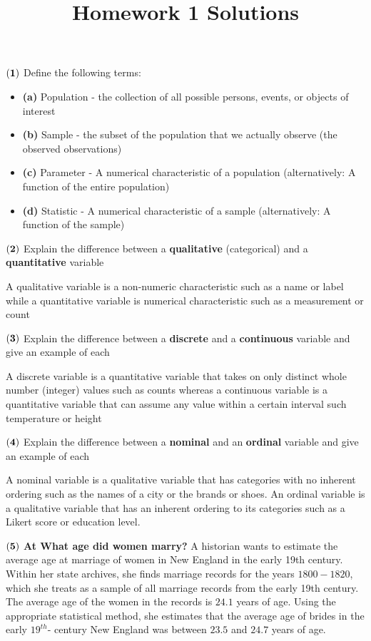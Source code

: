 \documentclass[
]{article}
\title{Homework 1 Solutions}
\author{}
\date{\vspace{-2.5em}}
\providecommand{\tightlist}{%
  \setlength{\itemsep}{0pt}\setlength{\parskip}{0pt}}
\begin{document}
\maketitle

\({\bf (1)}\) Define the following terms:

\begin{itemize}
\tightlist
\item
  \textbf{(a)} Population - the collection of all possible persons,
  events, or objects of interest
\item
  \textbf{(b)} Sample - the subset of the population that we actually
  observe (the observed observations)
\item
  \textbf{(c)} Parameter - A numerical characteristic of a population
  (alternatively: A function of the entire population)
\item
  \textbf{(d)} Statistic - A numerical characteristic of a sample
  (alternatively: A function of the sample)
\end{itemize}

\({\bf (2)}\) Explain the difference between a \textbf{qualitative}
(categorical) and a \textbf{quantitative} variable

{A qualitative variable is a non-numeric characteristic such as a name
or label while a quantitative variable is numerical characteristic such
as a measurement or count}

\({\bf (3)}\) Explain the difference between a \textbf{discrete} and a
\textbf{continuous} variable and give an example of each

{A discrete variable is a quantitative variable that takes on only
distinct whole number (integer) values such as counts whereas a
continuous variable is a quantitative variable that can assume any value
within a certain interval such temperature or height}

\({\bf (4)}\) Explain the difference between a \textbf{nominal} and an
\textbf{ordinal} variable and give an example of each

{A nominal variable is a qualitative variable that has categories with
no inherent ordering such as the names of a city or the brands or shoes.
An ordinal variable is a qualitative variable that has an inherent
ordering to its categories such as a Likert score or education level.}

\({\bf (5)}\) \textbf{At What age did women marry?} A historian wants to
estimate the average age at marriage of women in New England in the
early 19th century. Within her state archives, she finds marriage
records for the years \(1800 - 1820\), which she treats as a sample of
all marriage records from the early 19th century. The average age of the
women in the records is \(24.1\) years of age. Using the appropriate
statistical method, she estimates that the average age of brides in the
early \(19^{th}\)- century New England was between \(23.5\) and \(24.7\)
years of age.
\end{document}
